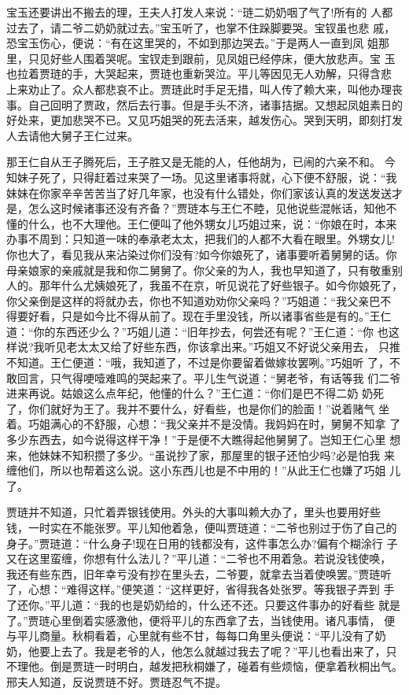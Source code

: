 宝玉还要讲出不搬去的理，王夫人打发人来说：“琏二奶奶咽了气了!所有的
人都过去了，请二爷二奶奶就过去。”宝玉听了，也掌不住跺脚要哭。宝钗虽也悲
戚，恐宝玉伤心，便说：“有在这里哭的，不如到那边哭去。”于是两人一直到凤
姐那里，只见好些人围着哭呢。宝钗走到跟前，见凤姐已经停床，便大放悲声。宝
玉也拉着贾琏的手，大哭起来，贾琏也重新哭泣。平儿等因见无人劝解，只得含悲
上来劝止了。众人都悲哀不止。贾琏此时手足无措，叫人传了赖大来，叫他办理丧
事。自己回明了贾政，然后去行事。但是手头不济，诸事拮据。又想起凤姐素日的
好处来，更加悲哭不已。又见巧姐哭的死去活来，越发伤心。哭到天明，即刻打发
人去请他大舅子王仁过来。

那王仁自从王子腾死后，王子胜又是无能的人，任他胡为，已闹的六亲不和。
今知妹子死了，只得赶着过来哭了一场。见这里诸事将就，心下便不舒服，说：“我
妹妹在你家辛辛苦苦当了好几年家，也没有什么错处，你们家该认真的发送发送才
是，怎么这时候诸事还没有齐备？”贾琏本与王仁不睦，见他说些混帐话，知他不
懂的什么，也不大理他。王仁便叫了他外甥女儿巧姐过来，说：“你娘在时，本来
办事不周到：只知道一味的奉承老太太，把我们的人都不大看在眼里。外甥女儿!
你也大了，看见我从来沾染过你们没有?如今你娘死了，诸事要听着舅舅的话。你
母亲娘家的亲戚就是我和你二舅舅了。你父亲的为人，我也早知道了，只有敬重别
人的。那年什么尤姨娘死了，我虽不在京，听见说花了好些银子。如今你娘死了，
你父亲倒是这样的将就办去，你也不知道劝劝你父亲吗？”巧姐道：“我父亲巴不
得要好看，只是如今比不得从前了。现在手里没钱，所以诸事省些是有的。”王仁
道：“你的东西还少么？”巧姐儿道：“旧年抄去，何尝还有呢？”王仁道：“你
也这样说?我听见老太太又给了好些东西，你该拿出来。”巧姐又不好说父亲用去，
只推不知道。王仁便道：“哦，我知道了，不过是你要留着做嫁妆罢咧。”巧姐听
了，不敢回言，只气得哽噎难鸣的哭起来了。平儿生气说道：“舅老爷，有话等我
们二爷进来再说。姑娘这么点年纪，他懂的什么？”王仁道：“你们是巴不得二奶
奶死了，你们就好为王了。我并不要什么，好看些，也是你们的脸面！”说着赌气
坐着。巧姐满心的不舒服，心想：“我父亲并不是没情。我妈妈在时，舅舅不知拿
了多少东西去，如今说得这样干净！”于是便不大瞧得起他舅舅了。岂知王仁心里
想来，他妹妹不知积攒了多少。“虽说抄了家，那屋里的银子还怕少吗?必是怕我
来缠他们，所以也帮着这么说。这小东西儿也是不中用的！”从此王仁也嫌了巧姐
儿了。

贾琏并不知道，只忙着弄银钱使用。外头的大事叫赖大办了，里头也要用好些
钱，一时实在不能张罗。平儿知他着急，便叫贾琏道：“二爷也别过于伤了自己的
身子。”贾琏道：“什么身子!现在日用的钱都没有，这件事怎么办?偏有个糊涂行
子又在这里蛮缠，你想有什么法儿？”平儿道：“二爷也不用着急。若说没钱使唤，
我还有些东西，旧年幸亏没有抄在里头去，二爷要，就拿去当着使唤罢。”贾琏听
了，心想：“难得这样。”便笑道：“这样更好，省得我各处张罗。等我银子弄到
手了还你。”平儿道：“我的也是奶奶给的，什么还不还。只要这件事办的好看些
就是了。”贾琏心里倒着实感激他，便将平儿的东西拿了去，当钱使用。诸凡事情，
便与平儿商量。秋桐看着，心里就有些不甘，每每口角里头便说：“平儿没有了奶
奶，他要上去了。我是老爷的人，他怎么就越过我去了呢？”平儿也看出来了，只
不理他。倒是贾琏一时明白，越发把秋桐嫌了，碰着有些烦恼，便拿着秋桐出气。
邢夫人知道，反说贾琏不好。贾琏忍气不提。

